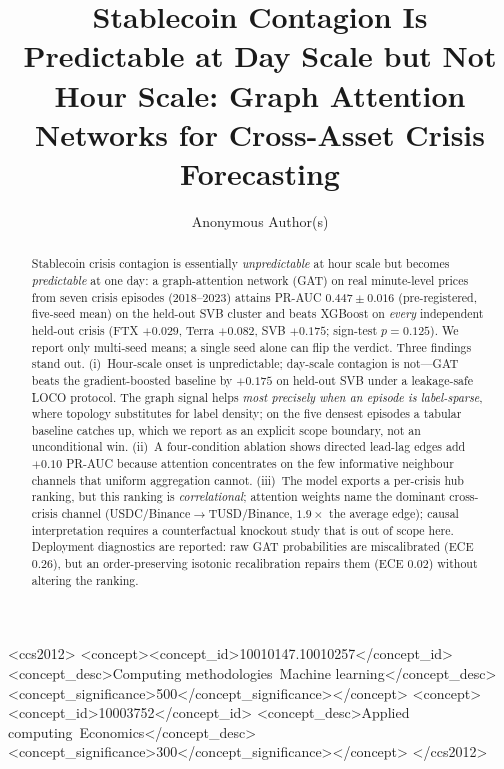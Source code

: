 \documentclass[sigconf,anonymous]{acmart}
\begin{document}

\title{Stablecoin Contagion Is Predictable at Day Scale but Not Hour Scale:
Graph Attention Networks for Cross-Asset Crisis Forecasting}

\author{Anonymous Author(s)}

\begin{abstract}
Stablecoin crisis contagion is essentially \emph{unpredictable} at hour scale but becomes
\emph{predictable} at one day: a graph-attention network (GAT) on real minute-level prices
from seven crisis episodes (2018--2023) attains PR-AUC $0.447\pm0.016$ (pre-registered,
five-seed mean) on the held-out SVB cluster and beats XGBoost on \emph{every} independent
held-out crisis (FTX $+0.029$, Terra $+0.082$, SVB $+0.175$; sign-test $p=0.125$).
We report only multi-seed means; a single seed alone can flip the verdict.
Three findings stand out.
(i)~Hour-scale onset is unpredictable; day-scale contagion is not---GAT beats the
gradient-boosted baseline by $+0.175$ on held-out SVB under a leakage-safe LOCO protocol.
The graph signal helps \emph{most precisely when an episode is label-sparse}, where
topology substitutes for label density; on the five densest episodes a tabular baseline
catches up, which we report as an explicit scope boundary, not an unconditional win.
(ii)~A four-condition ablation shows directed lead-lag edges add $+0.10$ PR-AUC because
attention concentrates on the few informative neighbour channels that uniform aggregation cannot.
(iii)~The model exports a per-crisis hub ranking, but this ranking is \emph{correlational};
attention weights name the dominant cross-crisis channel (USDC/Binance$\to$TUSD/Binance,
$1.9\times$ the average edge); causal interpretation requires a counterfactual knockout study
that is out of scope here.
Deployment diagnostics are reported: raw GAT probabilities are miscalibrated (ECE $0.26$), but an
order-preserving isotonic recalibration repairs them (ECE $0.02$) without altering the ranking.
\end{abstract}


\begin{CCSXML}
<ccs2012>
<concept><concept_id>10010147.10010257</concept_id>
<concept_desc>Computing methodologies~Machine learning</concept_desc>
<concept_significance>500</concept_significance></concept>
<concept><concept_id>10003752</concept_id>
<concept_desc>Applied computing~Economics</concept_desc>
<concept_significance>300</concept_significance></concept>
</ccs2012>
\end{CCSXML}
\end{document}
